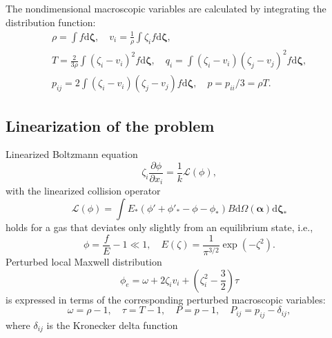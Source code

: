 \documentclass[aip,pof,preprint]{revtex4-1}
\newcommand{\dd}{\mathrm{d}}
\newcommand{\pder}[2][]{\frac{\partial#1}{\partial#2}}
\newcommand{\dzeta}{\boldsymbol{\dd\zeta}}
\begin{document}
The nondimensional macroscopic variables are calculated by integrating the distribution function:
\begin{equation}\label{eq:macro}
    \begin{gathered}
    \rho = \int f \dzeta, \quad
    v_i = \frac1{\rho} \int \zeta_i f \dzeta, \\
    T = \frac{2}{3\rho}\int(\zeta_i-v_i)^2 f \dzeta, \quad
    q_i = \int(\zeta_i-v_i)(\zeta_j-v_j)^2 f \dzeta, \\
    p_{ij} = 2 \int(\zeta_i-v_i)(\zeta_j-v_j) f \dzeta,
        \quad p = p_{ii}/3 = \rho T.
    \end{gathered}
\end{equation}

\subsection{Linearization of the problem}

Linearized Boltzmann equation
\begin{equation}\label{eq:linear_Boltzmann}
    \zeta_i \pder[\phi]{x_i} = \frac1k \mathcal{L}(\phi),
\end{equation}
with the linearized collision operator
\begin{equation}\label{eq:linear_ci}
    \mathcal{L}(\phi) = \int E_*(\phi'+\phi'_*-\phi-\phi_*) B
    \dd \Omega(\boldsymbol{\alpha}) \dzeta_*
\end{equation}
holds for a gas that deviates only slightly from an equilibrium state, i.e.,
\begin{equation}\label{eq:linear_condition}
    \phi = \frac{f}{E} - 1 \ll 1, \quad E(\zeta) = \frac1{\pi^{3/2}}\exp\left(-\zeta^2\right).
\end{equation}
Perturbed local Maxwell distribution
\begin{equation}\label{eq:linear_maxwellian}
    \phi_e = \omega + 2\zeta_i v_i + \left(\zeta_i^2-\frac32\right)\tau
\end{equation}
is expressed in terms of the corresponding perturbed macroscopic variables:
\begin{equation}
    \omega = \rho-1, \quad \tau = T-1, \quad P = p-1, \quad P_{ij} = p_{ij}-\delta_{ij},
\end{equation}
where \(\delta_{ij}\) is the Kronecker delta function
\end{document}
